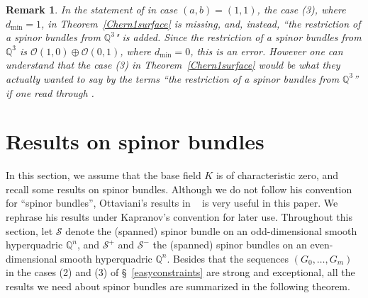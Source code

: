 \documentclass[a4paper,12pt]{amsart}
\newtheorem{rmk}[thm]{Remark}%
\begin{document}
\begin{rmk}\label{errorstatement}
In the statement of \cite[\S 2 Lemma 1]{pswnef} in case $(a,b)=(1,1)$, the case (3),
where $d_{\min}=1$, in Theorem~\ref{Chern1surface} is missing,
and, instead, ``the restriction of a spinor bundles from $\mathbb{Q}^3$" is added.
Since the restriction of a spinor bundles from $\mathbb{Q}^3$ is $\mathcal{O}(1,0)\oplus \mathcal{O}(0,1)$,
where $d_{\min}=0$,
this is an error. However one can understand that 
the case (3) in Theorem~\ref{Chern1surface}
would be 
what they actually wanted to say by the terms ``the restriction of a spinor bundles from $\mathbb{Q}^3$''
if one read through \cite[\S 3]{swCompo}.
\end{rmk}


\section{Results on spinor bundles}\label{Spinor bundles}
In this section, we assume that the base field $K$ is of characteristic zero,
and recall some results on spinor bundles.
Although we do not follow his convention for ``spinor bundles'', Ottaviani's results in ~\cite{ot}
is very useful in this paper. We rephrase his results under Kapranov's convention
for later use. 
Throughout this section,
let $\mathcal{S}$ denote the (spanned) spinor bundle on 
an odd-dimensional 
smooth hyperquadric
$\mathbb{Q}^{n}$,
and $\mathcal{S}^+$ and $\mathcal{S}^-$  the (spanned) spinor bundles on 
an even-dimensional 
smooth hyperquadric
$\mathbb{Q}^{n}$.
Besides that the sequences $(G_0,\dots, G_m)$ in the cases (2) and (3) of \S~\ref{easyconstraints}
are strong and exceptional,
all 
the results we need
about spinor bundles
are summarized in the following 
theorem.
\end{document}
